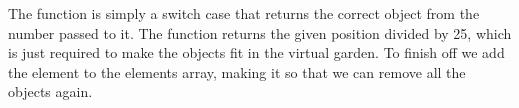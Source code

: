 The  function is simply a switch case that returns the correct object from the number passed to it. The  function returns the given position divided by 25, which is just required to make the objects fit in the virtual garden. To finish off we add the element to the elements array, making it so that we can remove all the objects again.